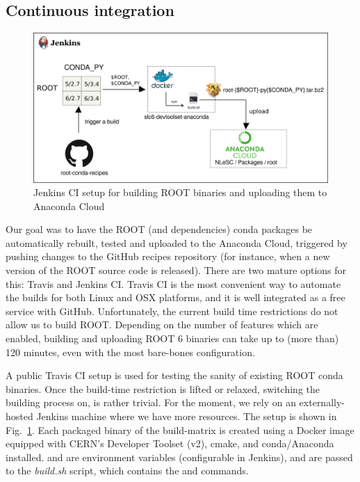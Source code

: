 \documentclass[a4paper]{jpconf}
\begin{document}
\subsection{Continuous integration}
\begin{figure}[!t]
\begin{center}
\includegraphics[width=0.8\linewidth]{./graphics/Jenkinssetup2.png}
\caption{Jenkins CI setup for building ROOT binaries and uploading them to Anaconda Cloud}
\label{fig:jenkins}
\end{center}
\end{figure}
Our goal was to have the ROOT (and dependencies) conda packages be automatically rebuilt, tested and uploaded 
to the Anaconda Cloud, triggered by pushing changes to the GitHub recipes repository (for instance, when a new version of the ROOT source code is released). 
There are two mature options for this: Travis and Jenkins CI. 
Travis CI is the most convenient way to automate the builds for both Linux and 
OSX platforms, and it is well integrated as a free service with GitHub. Unfortunately, the current build time restrictions do not 
allow us to build ROOT. Depending on the number of features which are enabled, building and uploading ROOT 6 binaries
 can take up to (more than) 120 minutes, even with 
the most bare-bones configuration.

A public Travis CI setup is used for testing the sanity of existing ROOT conda binaries. 
Once the build-time restriction is lifted or relaxed, switching the building process on, is rather trivial.
For the moment, we rely on an externally-hosted Jenkins machine where we have more resources.
The setup is shown in Fig.~\ref{fig:jenkins}. 
Each packaged binary of the build-matrix is created using a Docker image equipped with CERN's Developer Toolset 
(v2), cmake, and conda/Anaconda installed.  and  are environment variables 
(configurable in Jenkins), and are passed to the \textit{build.sh} script, which contains the  and 
commands.
\end{document}

